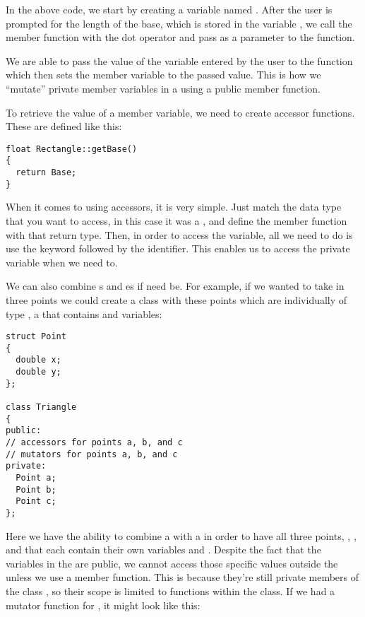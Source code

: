 In the above code, we start by creating a  variable named . 
After the user is prompted for the length of the base, which is stored in the variable , we call the  member function with the dot operator and pass  as a parameter to the function. 

We are able to pass the value of the variable entered by the user to the  function which then sets the member variable  to the passed value. 
This is how we ``mutate'' private member variables in a  using a public member function. 

To retrieve the value of a member variable, we need to create accessor functions. 
These are defined like this: 

\noindent\begin{minipage}{\linewidth}\begin{lstlisting}
float Rectangle::getBase()
{
  return Base;
}
\end{lstlisting}\end{minipage}

When it comes to using accessors, it is very simple. 
Just match the data type that you want to access, in this case it was a , and define the member function with that return type. 
Then, in order to access the variable, all we need to do is use the keyword  followed by the identifier. 
This enables us to access the private variable when we need to. 


We can also combine s and es if need be. 
For example, if we wanted to take in three points we could create a  class with these points which are individually of type , a  that contains  and  variables:

\noindent\begin{minipage}{\linewidth}\begin{lstlisting}
struct Point
{
  double x;
  double y;
};
	
class Triangle
{
public:
// accessors for points a, b, and c
// mutators for points a, b, and c
private:
  Point a;
  Point b;
  Point c;
};
\end{lstlisting}\end{minipage}

Here we have the ability to combine a  with a  in order to have all three points, , , and  that each contain their own variables  and .
Despite the fact that the variables in the  are public, we cannot access those specific values outside the  unless we use a member function. 
This is because they're still private members of the class , so their scope is limited to functions within the class. 
If we had a mutator function for , it might look like this:

